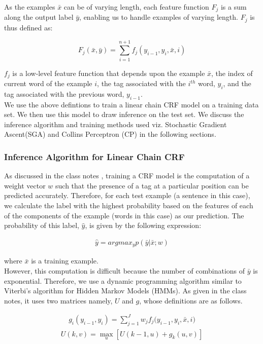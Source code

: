 \documentclass[11pt,a4paper,oneside]{article}
\begin{document}
As the examples $\bar{x}$ can be of varying length, each feature function $F_j$ is a sum along the output label $\bar{y}$, enabling us to handle examples of varying length. $F_j$ is thus defined as:

\begin{equation}
F_j (\bar{x}, \bar{y}) = \sum_{i=1}^{n+1}f_j(y_{i-1}, y_i, \bar{x}, i)
\end{equation}

$f_j$ is a low-level feature function that depends upon the example $\bar{x}$, the index of current word of the example $i$, the tag associated with the $i^{th}$ word, $y_i$, and the tag associated with the previous word, $y_{i-1}$.\\

We use the above defintions to train a linear chain CRF model on a training data set. We then use this model to draw inference on the test set. We discuss the inference algorithm and training methods used viz. Stochastic Gradient Ascent(SGA) and Collins Perceptron (CP) in the following sections.

\subsubsection{Inference Algorithm for Linear Chain CRF}
As discussed in the class notes \cite{classNotes}, training a CRF model is the computation of a weight vector $w$ such that the presence of a tag at a particular position can be predicted accurately. Therefore, for each test example (a sentence in this case), we calculate the label with the highest probability based on the features of each of the components of the example (words in this case) as our prediction. The probability of this label, $\hat{y}$, is given by the following expression:

\begin{align}
\hat{y} = argmax_y p(\bar{y}|\bar{x};w)
\end{align}

where $\bar{x}$ is a training example.\\

However, this computation is difficult because the number of combinations of $\bar{y}$ is exponential. Therefore, we use a dynamic programming algorithm similar to Viterbi's algorithm for Hidden Markov Models (HMMs). As given in the class notes\cite{classNotes}, it uses two matrices namely, $U$ and $g$, whose definitions are as follows.

\begin{align}
g_i(y_{i-1}, y_{i}) = \sum^{J}_{j = 1}{w_jf_j(y_{i-1}, y_{i}, \bar{x}, i})
\end{align}
\begin{align}
U(k,v) = \max_{u}[U(k - 1, u) + g_k(u, v)]
\end{align}
\end{document}
